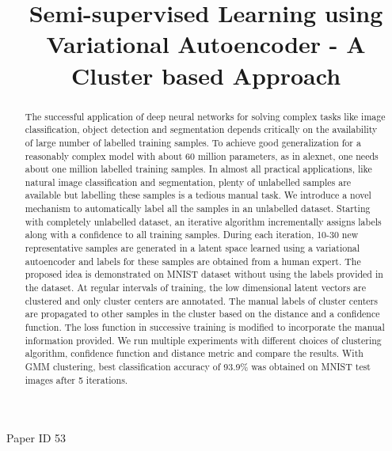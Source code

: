 \documentclass[runningheads]{llncs}
\begin{document}
\title{Semi-supervised Learning using Variational Autoencoder - A Cluster based Approach}
%
%
\maketitle              %
%
Paper ID 53

\begin{abstract}
    The successful application of deep neural networks for solving complex tasks like image classification, object detection and segmentation depends critically on the availability of large number of labelled training samples.
To achieve good generalization for a reasonably complex model with about 60 million parameters, as in alexnet, one needs about one million labelled training samples.
In almost all practical applications, like natural image classification and segmentation,  plenty of unlabelled samples are available but labelling these samples is a tedious manual task.
We introduce a novel mechanism to automatically label all the samples in an unlabelled dataset.
    Starting with completely unlabelled dataset, an iterative algorithm incrementally assigns labels along with a confidence to all training samples.
    During each iteration, 10-30 new representative samples are generated in a latent space learned using a variational autoencoder and labels for these samples are obtained from a human expert.
The proposed  idea  is demonstrated on MNIST dataset without using the labels provided in the dataset.
At regular intervals of training, the low dimensional latent vectors are clustered and only cluster centers are annotated.
    The manual labels of cluster centers are propagated to other samples in the cluster based on the distance and a confidence function.
The loss function in successive training is modified to incorporate the manual information provided.
    We run multiple experiments with different choices of clustering algorithm, confidence function and distance metric and compare the results.
With GMM clustering, best classification accuracy of 93.9\% was obtained on MNIST test images after 5 iterations.

\end{abstract}
%
%
%
\end{document}
